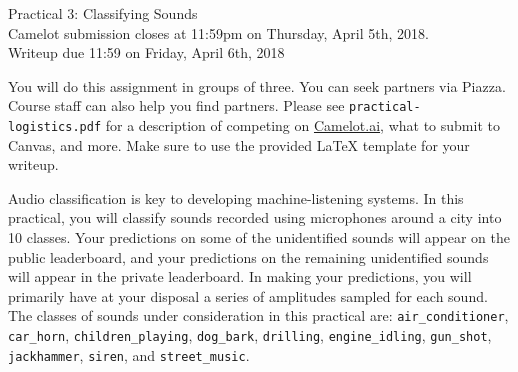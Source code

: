 \documentclass[12pt]{article}
\begin{document}
\begin{center}
{\Large Practical 3: Classifying Sounds}\\

Camelot submission closes at 11:59pm on Thursday, April 5th, 2018.\\
Writeup due 11:59 on Friday, April 6th, 2018\\
\end{center}

\noindent You will do this assignment in groups of three. You can seek partners via Piazza. Course staff can also help you find partners. 
Please see \texttt{practical-logistics.pdf} for a description
of competing on \href{https://portal.camelot.ai}{Camelot.ai}, what to submit to Canvas, and more. 
Make sure to use the provided \LaTeX \hspace{1pt} template for your writeup.

Audio classification is key to developing machine-listening systems. In this practical, you will classify sounds recorded using microphones around a city into 10 classes.
Your predictions on some of the unidentified sounds will appear on the public leaderboard, 
and your predictions on the remaining unidentified sounds will appear in the private leaderboard. In making your predictions, 
you will primarily have at your disposal a series of amplitudes sampled for each sound.
The classes of sounds under consideration in this practical are: \texttt{air\_conditioner}, \texttt{car\_horn}, \texttt{children\_playing}, \texttt{dog\_bark}, \texttt{drilling}, \texttt{engine\_idling}, \texttt{gun\_shot}, \texttt{jackhammer}, \texttt{siren}, and \texttt{street\_music}. 
\end{document}
